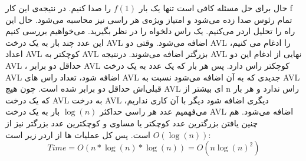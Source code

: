 {حال برای حل مسئله کافی است تنها یک بار 
$f(1)$
را صدا کنیم. در نتیجه‌ی این کار f تمام رئوس صدا زده می‌شود و امتیاز ویژه‌ی هر راسی نیز محاسبه می‌شود. حال این راه را تحلیل اردر می‌کنیم. یک راس دلخواه را در نظر بگیرید. می‌خواهیم بررسی کنیم این عدد چند بار به یک درخت AVL اضافه می‌شود. وقتی دو AVL را ادغام می کنیم، اعداد AVL کوچکتر به AVL بزرگتر اضافه می‌شوند. درنتیجه AVL نهایی از ادغام این دو AVL ، حداقل دو برابر AVL کوچکتر راس دارد. پس هر بار که یک عدد به یک درخت AVL اضافه شود، تعداد راس های AVL جدیدی که به آن اضافه می‌شود نسبت به AVL قبلی‌اش حداقل دو برابر شده است. چون هیچ AVL ای بیشتر از n راس ندارد و هر بار که یک درخت AVL به درخت AVL دیگری اضافه شود دیگر با آن کاری نداریم، می‌فهمیم عدد هر راسی حداکثر 
$\log(n)$
بار به یک درخت AVL اضافه می‌شود. هم چنین یافتن بزرگترین عدد کوچکتر یا مساوی و کوچکترین عدد بزرگتر نیز از
$O(\log(n))$
است. پس کل عملیات ها از اردر زیر است:
$$Time = O(n * \log(n) * \log(n)) = O(n{\log(n)}^2)$$

}

%	
%
%
%		



